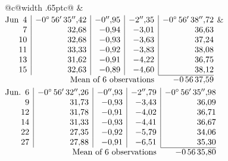 \noindent\begin{tabular}{@{}c@{\hspace{.4em}\vrule width .65pt\hspace{.4em}}c@{}}
 &
 \\[.18ex]
\(\begin{array}[t]{@{}r|r|r|r|r@{}}
\text{Jun}\enspace 4 & -0^\circ\,56'\,35''{,}42 & -0''{,}95 & -2''{,}35 & -0^\circ\,56'\,38''{,}72\\
7 & 32{,}68 & -0{,}94 & -3{,}01 & 36{,}63\\
10 & 32{,}68 & -0{,}93 & -3{,}63 & 37{,}24\\
11 & 33{,}33 & -0{,}92 & -3{,}83 & 38{,}08\\
13 & 31{,}62 & -0{,}91 & -4{,}22 & 36{,}75\\
15 & 32{,}63 & -0{,}89 & -4{,}60 & 38{,}12\\
\cline{5-5}
\multicolumn{4}{r}{\text{Mean of 6 observations}} & -0\,56\,37{,}59
\end{array}\)
&
\(\begin{array}[t]{@{}r|r|r|r|r@{}}
\text{Jun.}\enspace 6 & -0^\circ\,56'\,32''{,}26 & -0''{,}93 & -2''{,}79 & -0^\circ\,56'\,35''{,}98\\
9 & 31{,}73 & -0{,}93 & -3{,}43 & 36{,}09\\
12 & 31{,}78 & -0{,}91 & -4{,}02 & 36{,}71\\
14 & 31{,}33 & -0{,}93 & -4{,}41 & 36{,}67\\
22 & 27{,}35 & -0{,}92 & -5{,}79 & 34{,}06\\
27 & 27{,}88 & -0{,}91 & -6{,}51 & 35{,}30\\
\cline{5-5}
\multicolumn{4}{r}{\text{Mean of 6 observations}} & -0\,56\,35{,}80
\end{array}\)
\end{tabular}\par\medskip
{}
